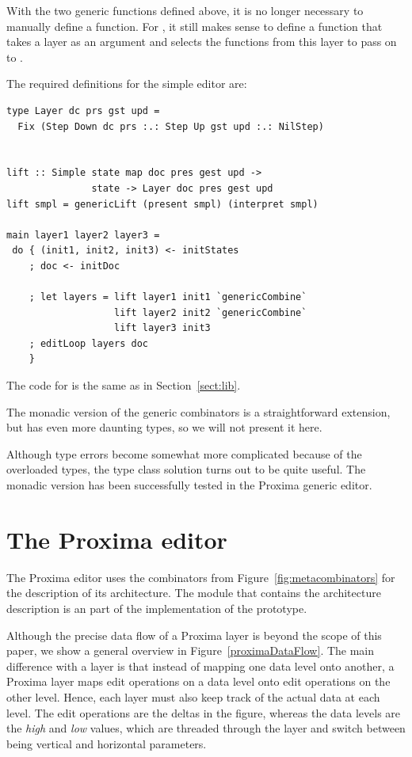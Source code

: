 \documentclass{llncs}
\begin{document}


With the two generic functions defined above, it is no longer necessary to manually define a  function. For , it still makes sense to define a function that takes a layer as an argument and selects the functions from this layer to pass on to .

The required definitions for the simple editor are:

\begin{small}
\begin{verbatim}
type Layer dc prs gst upd = 
  Fix (Step Down dc prs :.: Step Up gst upd :.: NilStep)

                
lift :: Simple state map doc pres gest upd ->
               state -> Layer doc pres gest upd
lift smpl = genericLift (present smpl) (interpret smpl)

main layer1 layer2 layer3 =
 do { (init1, init2, init3) <- initStates
    ; doc <- initDoc 

    ; let layers = lift layer1 init1 `genericCombine` 
                   lift layer2 init2 `genericCombine`
                   lift layer3 init3
    ; editLoop layers doc
    }
\end{verbatim}
\end{small}

The code for  is the same as in Section~\ref{sect:lib}.

The monadic version of the generic combinators is a straightforward extension, but has even more daunting types, so we will not present it here. 

Although type errors become somewhat more complicated because of the overloaded types, the type class solution turns out to be quite useful. The monadic version has been successfully tested in the Proxima generic editor.
		
\section{The Proxima editor} \label{sect:proxima}


The Proxima editor uses the combinators from Figure~\ref{fig:metacombinators}  for the description of its architecture. The module that contains the architecture description is an part of the implementation of the prototype. 

Although the precise data flow of a Proxima layer is beyond the scope of this paper, we show a general overview in Figure~\ref{proximaDataFlow}. The main difference with a  layer is that instead of mapping one data level onto another, a Proxima layer maps edit operations on a data level onto edit operations on the other level. Hence, each layer must also keep track of the actual data at each level. The edit operations are the deltas in the figure, whereas the data levels are the {\em high} and {\em low} values, which are threaded through the layer and switch between being vertical and horizontal parameters. 
\end{document}
